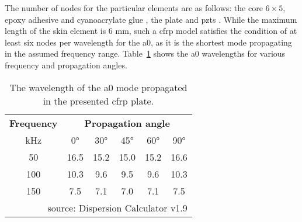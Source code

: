 The number of nodes for the particular elements are as follows: the core \(6 \times 5\), epoxy adhesive and cyanoacrylate glue , the plate  and \acp{pzt} .
While the maximum length of the skin element is 6 \unit{\mm}, such a \ac{cfrp} model satisfies the condition of at least six nodes per wavelength for the \ac{a0}, as it is the shortest mode propagating in the assumed frequency range.
Table~\ref{tab:wavelength} shows the \ac{a0} wavelengths for various frequency and propagation angles.
\begin{table}[H]
	\small
	\tabcolsep=0.75cm
	\caption{\label{tab:wavelength}The wavelength of the \ac{a0} mode propagated in the presented \ac{cfrp} plate.}
	\begin{tabular}{cccccc}
		\toprule
		\textbf{Frequency} & \multicolumn{5}{c}{\textbf{Propagation angle}}\\
		\unit{\kHz} & \ang{0} & \ang{30} & \ang{45} & \ang{60} & \ang{90}\\
		\midrule
		50 & 16.5& 15.2&15.0&15.2&16.6\\
		100 & 10.3& 9.6&9.5&9.6&10.3\\
		150 & 7.5& 7.1&7.0&7.1&7.5\\
		\bottomrule
		\multicolumn{6}{r}{{\scriptsize{source: Dispersion Calculator v1.9}}}
	\end{tabular}
\end{table}